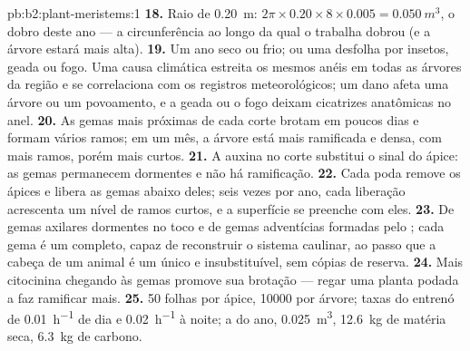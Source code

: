 \begin{solution}{pb:b2:plant-meristems:1}
\textbf{18.} Raio de \qty{0.20}{m}: $2\pi\times 0.20\times 8\times
0.005 = \qty{0.050}{m^3}$, o dobro deste ano --- a circunferência ao
longo da qual o  trabalha dobrou (e a árvore estará mais alta).
\textbf{19.} Um ano seco ou frio; ou uma desfolha por insetos, geada ou
fogo. Uma causa climática estreita os mesmos anéis em todas as árvores
da região e se correlaciona com os registros meteorológicos; um dano
afeta uma árvore ou um povoamento, e a geada ou o fogo deixam cicatrizes
anatômicas no anel.
\textbf{20.} As gemas mais próximas de cada corte brotam em poucos dias
e formam vários ramos; em um mês, a árvore está mais ramificada e
densa, com mais ramos, porém mais curtos.
\textbf{21.} A auxina no corte substitui o sinal do ápice: as gemas
permanecem dormentes e não há ramificação.
\textbf{22.} Cada poda remove os ápices e libera as gemas abaixo deles;
seis vezes por ano, cada liberação acrescenta um nível de ramos curtos,
e a superfície se preenche com eles.
\textbf{23.} De gemas axilares dormentes no toco e de gemas
adventícias formadas pelo ; cada gema é um  completo,
capaz de reconstruir o sistema caulinar, ao passo que a cabeça de um
animal é um  único e insubstituível, sem cópias de reserva.
\textbf{24.} Mais citocinina chegando às gemas promove sua brotação ---
regar uma planta podada a faz ramificar mais.
\textbf{25.} 50 folhas por ápice, \num{10000} por árvore; taxas do
entrenó de \qty{0.01}{h^{-1}} de dia e \qty{0.02}{h^{-1}} à noite; a
 do ano, \qty{0.025}{m^3}, \qty{12.6}{kg} de matéria seca,
\qty{6.3}{kg} de carbono.
\end{solution}
